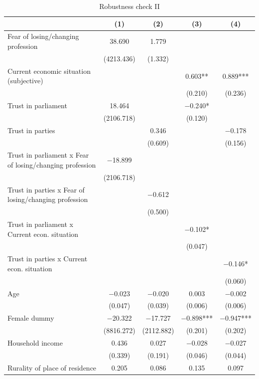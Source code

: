 \documentclass[
]{article}
\begin{document}
\begin{table}[!h]

\caption{\label{tab:regression-results1-robustness2}Robustness check II}
\centering
\begin{tabular}[t]{lcccc}
\toprule
  & (1) & (2) & (3) & (4)\\
\midrule
Fear of losing/changing profession & \num{38.690} & \num{1.779} &  & \\
 & (\num{4213.436}) & (\num{1.332}) &  & \\
Current economic situation (subjective) &  &  & \num{0.603}** & \num{0.889}***\\
 &  &  & (\num{0.210}) & (\num{0.236})\\
Trust in parliament & \num{18.464} &  & \num{-0.240}* & \\
 & (\num{2106.718}) &  & (\num{0.120}) & \\
Trust in parties &  & \num{0.346} &  & \num{-0.178}\\
 &  & (\num{0.609}) &  & (\num{0.156})\\
Trust in parliament x Fear of losing/changing profession & \num{-18.899} &  &  & \\
 & (\num{2106.718}) &  &  & \\
Trust in parties x Fear of losing/changing profession &  & \num{-0.612} &  & \\
 &  & (\num{0.500}) &  & \\
Trust in parliament x Current econ. situation &  &  & \num{-0.102}* & \\
 &  &  & (\num{0.047}) & \\
Trust in parties x Current econ. situation &  &  &  & \num{-0.146}*\\
 &  &  &  & (\num{0.060})\\
Age & \num{-0.023} & \num{-0.020} & \num{0.003} & \num{-0.002}\\
 & (\num{0.047}) & (\num{0.039}) & (\num{0.006}) & (\num{0.006})\\
Female dummy & \num{-20.322} & \num{-17.727} & \num{-0.898}*** & \num{-0.947}***\\
 & (\num{8816.272}) & (\num{2112.882}) & (\num{0.201}) & (\num{0.202})\\
Household income & \num{0.436} & \num{0.027} & \num{-0.028} & \num{-0.027}\\
 & (\num{0.339}) & (\num{0.191}) & (\num{0.046}) & (\num{0.044})\\
Rurality of place
of residence & \num{0.205} & \num{0.086} & \num{0.135} & \num{0.097}\\

\end{tabular}
\end{table}
\end{document}
